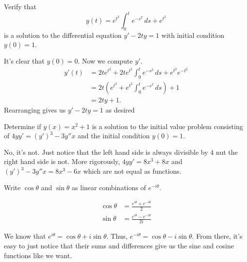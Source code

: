 \documentclass[12 pt, letterpaper]{hmcpset}
\begin{document}
\pagebreak

\begin{problem}[3:]
	Verify that
	\[
		y(t) = e^{t^{2}} \int_{0}^{t} e^{-s^{2}} \, ds + e^{t^{2}}
	\]
	is a solution to the differential equation $y' - 2t y = 1$ with initial condition $y(0) = 1$.
\end{problem}

\begin{solution}
	It's clear that $y(0) = 0$. Now we compute $y'$.
	\[
		\begin{split}
			y'(t) & = 2t e^{t^{2}} + 2t e^{t^{2}} \int_{0}^{t} e^{- s^{2}} \, ds + e^{t^{2}} e^{-t^{2}} \\
			      & = 2t (e^{t^{2}} + e^{t^{2}} \int_{0}^{t} e^{- s^{2}} \, ds ) + 1 \\
			      & = 2t y + 1.
		\end{split}
	\]
	Rearranging gives us $y' - 2t y = 1$ as desired
\end{solution}

\pagebreak

\begin{problem}[4:]
	Determine if $y(x) = x^{2} + 1$ is a solution to the initial value problem consisting of $4yy' = (y')^{3} - 3 y'' x$ and the initial condition $y(0) = 1$.
\end{problem}

\begin{solution}
	No, it's not. Just notice that the left hand side is always divisible by $4$ nut the right hand side is not. More rigorously, $4yy' = 8 x^{3} + 8 x$ and $(y')^{3} - 3 y'' x = 8 x^{3} - 6 x$ which are not equal as functions.
\end{solution}

\pagebreak

\begin{problem}[5:]
	Write $\cos{\theta}$ and $\sin{\theta}$ as linear combinations of $e^{-i \theta}$.
\end{problem}

\begin{solution}
	\[
		\boxed{
			\begin{aligned}
				\cos{\theta} & = \frac{e^{i \theta} + e^{- i \theta}}{2} \\
				\sin{\theta} & = \frac{e^{i \theta} - e^{- i \theta}}{2 i}
			\end{aligned}
		}	
	\]

	We know that $e^{i \theta} = \cos{\theta} + i \sin{\theta}$. Thus, $e^{- i \theta} = \cos{\theta} - i \sin{\theta}$. From there, it's easy to just notice that their sums and differences give us the sine and cosine functions like we want.
\end{solution}
\end{document}
